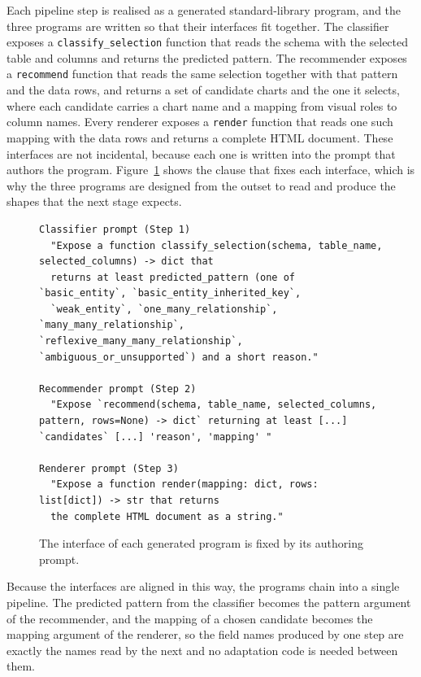 Each pipeline step is realised as a generated standard-library program, and the three programs are written so that their interfaces fit together. The classifier exposes a \texttt{classify\_selection} function that reads the schema with the selected table and columns and returns the predicted pattern. The recommender exposes a \texttt{recommend} function that reads the same selection together with that pattern and the data rows, and returns a set of candidate charts and the one it selects, where each candidate carries a chart name and a mapping from visual roles to column names. Every renderer exposes a \texttt{render} function that reads one such mapping with the data rows and returns a complete HTML document. These interfaces are not incidental, because each one is written into the prompt that authors the program. Figure~\ref{lst:prompt-contracts} shows the clause that fixes each interface, which is why the three programs are designed from the outset to read and produce the shapes that the next stage expects.

\begin{figure}[htbp]
\begin{lstlisting}[style=prompt]
Classifier prompt (Step 1)
  "Expose a function classify_selection(schema, table_name, selected_columns) -> dict that 
  returns at least predicted_pattern (one of `basic_entity`, `basic_entity_inherited_key`, 
  `weak_entity`, `one_many_relationship`, `many_many_relationship`, `reflexive_many_many_relationship`, `ambiguous_or_unsupported`) and a short reason."

Recommender prompt (Step 2)
  "Expose `recommend(schema, table_name, selected_columns, pattern, rows=None) -> dict` returning at least [...] `candidates` [...] 'reason', 'mapping' "

Renderer prompt (Step 3)
  "Expose a function render(mapping: dict, rows: list[dict]) -> str that returns 
  the complete HTML document as a string."
\end{lstlisting}
\caption{The interface of each generated program is fixed by its authoring prompt.}
\label{lst:prompt-contracts}
\end{figure}

Because the interfaces are aligned in this way, the programs chain into a single pipeline. The predicted pattern from the classifier becomes the pattern argument of the recommender, and the mapping of a chosen candidate becomes the mapping argument of the renderer, so the field names produced by one step are exactly the names read by the next and no adaptation code is needed between them.

